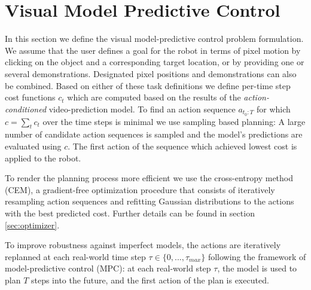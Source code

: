 \section{Visual Model Predictive Control}\label{sec:prelim}
\label{sec:vmpc}

In this section we define the visual model-predictive control problem formulation. We assume that the user defines a goal for the robot in terms of pixel motion by clicking on the object and a corresponding target location, or by providing one or several demonstrations. Designated pixel positions and demonstrations can also be combined. Based on either of these task definitions we define per-time step cost functions $c_t$ which are computed based on the results of the \emph{action-conditioned} video-prediction model. To find an action sequence $a_{t_0:T}$ for which $c = \sum_t{c_t}$ over the time steps is minimal we use sampling based planning: A large number of candidate action sequences is sampled and the model's predictions are evaluated using $c$. The first action of the sequence which achieved lowest cost is applied to the robot.

To render the planning process more efficient we use the cross-entropy method (CEM), a gradient-free optimization procedure that consists of iteratively resampling action sequences and refitting Gaussian distributions to the actions with the best predicted cost. Further details can be found in section \ref{sec:optimizer}.

To improve robustness against imperfect models, the actions are iteratively replanned at each real-world time step $\tau \in \{0,...,\tau_{max}\}$ following the framework of model-predictive control (MPC): at each real-world step $\tau$, the model is used to plan $T$ steps into the future, and the first action of the plan is executed.





